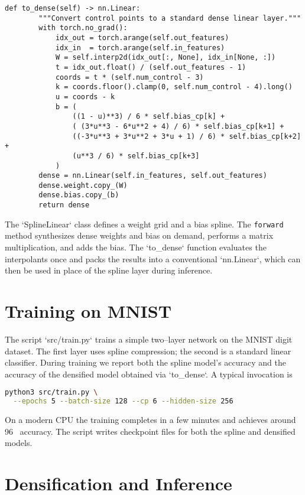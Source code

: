 \documentclass[12pt]{article}
\begin{document}
\begin{lstlisting}[caption={Simplified implementation of a spline‐based linear layer.}]
    def to_dense(self) -> nn.Linear:
        """Convert control points to a standard dense linear layer."""
        with torch.no_grad():
            idx_out = torch.arange(self.out_features)
            idx_in  = torch.arange(self.in_features)
            W = self.interp2d(idx_out[:, None], idx_in[None, :])
            t = idx_out.float() / (self.out_features - 1)
            coords = t * (self.num_control - 3)
            k = coords.floor().clamp(0, self.num_control - 4).long()
            u = coords - k
            b = (
                ((1 - u)**3) / 6 * self.bias_cp[k] +
                ( (3*u**3 - 6*u**2 + 4) / 6) * self.bias_cp[k+1] +
                ((-3*u**3 + 3*u**2 + 3*u + 1) / 6) * self.bias_cp[k+2] +
                (u**3 / 6) * self.bias_cp[k+3]
            )
        dense = nn.Linear(self.in_features, self.out_features)
        dense.weight.copy_(W)
        dense.bias.copy_(b)
        return dense
\end{lstlisting}

The `SplineLinear` class defines a weight grid and a bias spline.  The
\texttt{forward} method synthesizes dense weights and bias on demand, performs a matrix
multiplication, and adds the bias.  The `to\_dense` function evaluates the interpolants once
and packs the results into a conventional `nn.Linear`, which can then be used
in place of the spline layer during inference.

\section{Training on MNIST}

The script `src/train.py` trains a simple two–layer network on the MNIST digit dataset.  The
first layer uses spline compression; the second is a standard linear classifier.  During
training we report both the spline model’s accuracy and the accuracy of the densified model
obtained via `to_dense`.  A typical invocation is

\begin{lstlisting}[language=bash, caption={Training the spline network.}]
python3 src/train.py \
  --epochs 5 --batch-size 128 --cp 6 --hidden-size 256
\end{lstlisting}

On a modern CPU the training completes in a few minutes and achieves around 96 %
accuracy.  The script writes checkpoint files for both the spline and densified models.

\section{Densification and Inference}
\end{document}
